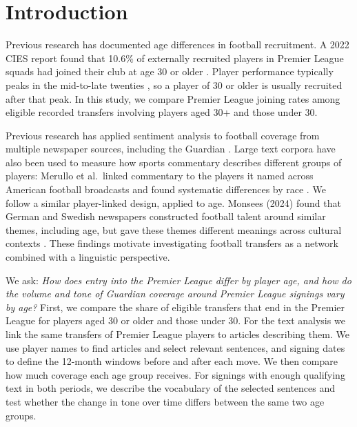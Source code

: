 \section*{Introduction}

Previous research has documented age differences in football recruitment. A 2022 CIES report found that 10.6\% of externally recruited players in Premier League squads had joined their club at age 30 or older \cite{poli2022recruitment}. Player performance typically peaks in the mid-to-late twenties \cite{dendir2016peak}, so a player of 30 or older is usually recruited after that peak. In this study, we compare Premier League joining rates among eligible recorded transfers involving players aged 30+ and those under 30.

Previous research has applied sentiment analysis to football coverage from multiple newspaper sources, including the Guardian \cite{dotgrau2019representation}. Large text corpora have also been used to measure how sports commentary describes different groups of players: Merullo et al.\ linked commentary to the players it named across 
American football broadcasts and found systematic differences by race \cite{merullo2019commentator}. We follow a similar player-linked design, applied to age. Monsees (2024) found that German and Swedish newspapers constructed football talent around similar themes, including age, but gave these themes different meanings across cultural contexts \cite{monsees2024talent}. These findings motivate investigating football transfers as a network combined with a linguistic perspective.

We ask: \textit{How does entry into the Premier League differ by player age, and how do the volume and tone of Guardian coverage around Premier League signings vary by age?} First, we compare the share of eligible transfers that end in the Premier League for players aged 30 or older and those under 30.
For the text analysis we link the same transfers of Premier League players to articles describing them. We use player names to find articles and select relevant sentences, and signing dates to define the 12-month windows before and after each move. We then compare how much coverage each age group receives. For signings with enough qualifying text in both periods, we describe the vocabulary of the selected sentences and test whether the change in tone over time differs between the same two age groups.





